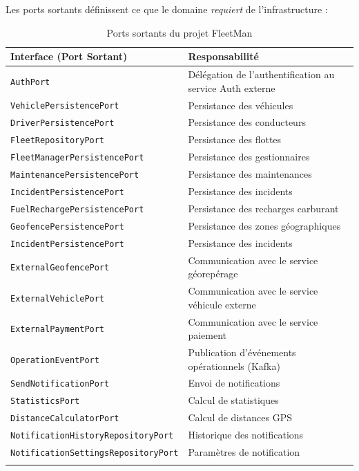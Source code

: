 \documentclass[12pt,a4paper]{report}
\begin{document}
Les ports sortants définissent ce que le domaine \textit{requiert} de l'infrastructure :

\begin{longtable}{p{5.5cm}p{7.5cm}}
\toprule
\textbf{Interface (Port Sortant)} & \textbf{Responsabilité} \\
\midrule
\endhead
\texttt{AuthPort} & Délégation de l'authentification au service Auth externe \\
\texttt{VehiclePersistencePort} & Persistance des véhicules \\
\texttt{DriverPersistencePort} & Persistance des conducteurs \\
\texttt{FleetRepositoryPort} & Persistance des flottes \\
\texttt{FleetManagerPersistencePort} & Persistance des gestionnaires \\
\texttt{MaintenancePersistencePort} & Persistance des maintenances \\
\texttt{IncidentPersistencePort} & Persistance des incidents \\
\texttt{FuelRechargePersistencePort} & Persistance des recharges carburant \\
\texttt{GeofencePersistencePort} & Persistance des zones géographiques \\
\texttt{IncidentPersistencePort} & Persistance des incidents \\
\texttt{ExternalGeofencePort} & Communication avec le service géorepérage \\
\texttt{ExternalVehiclePort} & Communication avec le service véhicule externe \\
\texttt{ExternalPaymentPort} & Communication avec le service paiement \\
\texttt{OperationEventPort} & Publication d'événements opérationnels (Kafka) \\
\texttt{SendNotificationPort} & Envoi de notifications \\
\texttt{StatisticsPort} & Calcul de statistiques \\
\texttt{DistanceCalculatorPort} & Calcul de distances GPS \\
\texttt{NotificationHistoryRepositoryPort} & Historique des notifications \\
\texttt{NotificationSettingsRepositoryPort} & Paramètres de notification \\
\bottomrule
\caption{Ports sortants du projet FleetMan}
\end{longtable}

\end{document}
